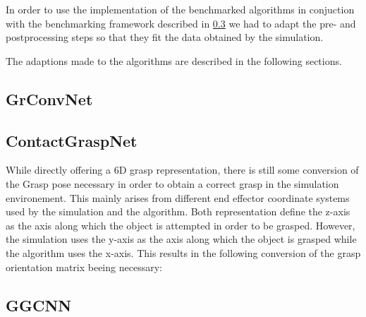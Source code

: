 In order to use the implementation of the benchmarked algorithms in conjuction with the benchmarking framework described in \ref{} we had to adapt
the pre- and postprocessing steps so that they fit the data obtained by the simulation.

The adaptions made to the algorithms are described in the following sections.


\subsection{GrConvNet}


\subsection{ContactGraspNet}
While directly offering a 6D grasp representation, there is still some conversion of the Grasp pose necessary in order to obtain a correct grasp in the simulation environement.
This mainly arises from different end effector coordinate systems used by the simulation and the algorithm.
Both representation define the z-axis as the axis along which the object is attempted in order to be grasped.
However, the simulation uses the y-axis as the axis along which the object is grasped while the algorithm uses the x-axis.
This results in the following conversion of the grasp orientation matrix beeing necessary:

\subsection{GGCNN}

